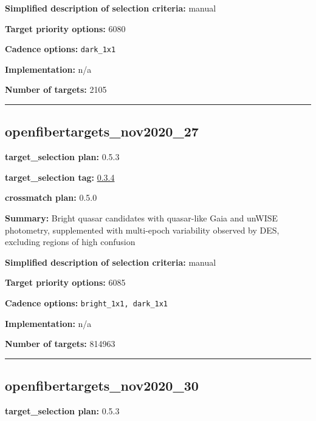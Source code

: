 \noindent\textbf{Simplified description of selection criteria:} manual


\noindent\textbf{Target priority options:} 6080

\noindent\textbf{Cadence options:} \texttt{dark\_1x1}

\noindent\textbf{Implementation:} n/a

\noindent\textbf{Number of targets:} 2105

\begin{center}\rule{0.5\linewidth}{0.5pt}\end{center}

\hypertarget{openfibertargets_nov2020_27_plan0.5.3}{%
\subsection{openfibertargets\_nov2020\_27}\label{openfibertargets_nov2020_27_plan0.5.3}}

\noindent\textbf{target\_selection plan:} 0.5.3

\noindent\textbf{target\_selection tag:}
\href{https://github.com/sdss/target_selection/tree/0.3.4/}{0.3.4}

\noindent\textbf{crossmatch plan:} 0.5.0

\noindent\textbf{Summary:} Bright quasar candidates with quasar-like Gaia and
unWISE photometry, supplemented with multi-epoch variability observed by
DES, excluding regions of high confusion

\noindent\textbf{Simplified description of selection criteria:} manual


\noindent\textbf{Target priority options:} 6085

\noindent\textbf{Cadence options:} \texttt{bright\_1x1,\ dark\_1x1}

\noindent\textbf{Implementation:} n/a

\noindent\textbf{Number of targets:} 814963

\begin{center}\rule{0.5\linewidth}{0.5pt}\end{center}

\hypertarget{openfibertargets_nov2020_30_plan0.5.3}{%
\subsection{openfibertargets\_nov2020\_30}\label{openfibertargets_nov2020_30_plan0.5.3}}

\noindent\textbf{target\_selection plan:} 0.5.3

